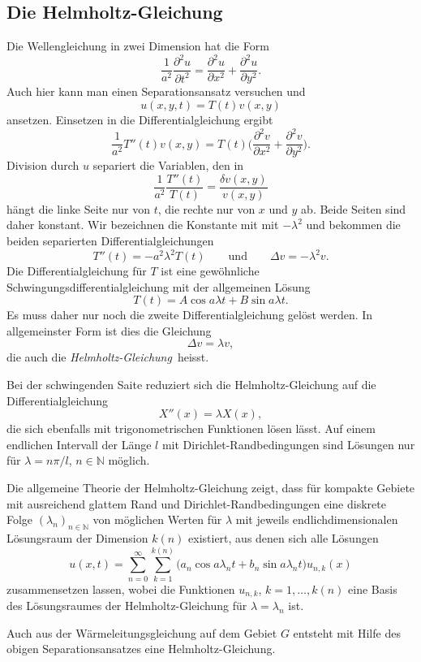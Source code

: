 \subsection{Die Helmholtz-Gleichung}
Die Wellengleichung in zwei Dimension hat die Form
\[
\frac{1}{a^2}
\frac{\partial^2u}{\partial t^2}
=
\frac{\partial^2 u}{\partial x^2}
+
\frac{\partial^2 u}{\partial y^2}.
\]
Auch hier kann man einen Separationsansatz versuchen und
\[
u(x,y,t) = T(t) v(x,y)
\]
ansetzen.
Einsetzen in die Differentialgleichung ergibt
\[
\frac{1}{a^2}
T''(t) v(x,y)
=
T(t)
\biggl(
\frac{\partial^2 v}{\partial x^2}
+
\frac{\partial^2 v}{\partial y^2}
\biggr).
\]
Division durch $u$ separiert die Variablen, den in
\[
\frac{1}{a^2}
\frac{T''(t)}{T(t)}
=
\frac{\delta v(x,y)}{v(x,y)}
\]
hängt die linke Seite nur von $t$, die rechte nur von $x$ und $y$ ab.
Beide Seiten sind daher konstant.
Wir bezeichnen die Konstante mit mit $-\lambda^2$ und bekommen die
beiden separierten Differentialgleichungen
\[
T''(t) = -a^2\lambda^2 T(t)
\qquad\text{und}\qquad
\Delta v = -\lambda^2 v.
\]
Die Differentialgleichung für $T$ ist eine gewöhnliche
Schwingungsdifferentialgleichung mit der allgemeinen Lösung
\[
T(t) = A\cos a\lambda t + B \sin a\lambda t.
\]
Es muss daher nur noch die zweite Differentialgleichung gelöst
werden.
In allgemeinster Form ist dies die Gleichung
\begin{equation}
\Delta v = \lambda v,
\end{equation}
die auch die {\em Helmholtz-Gleichung} heisst.
%


Bei der schwingenden Saite reduziert sich die Helmholtz-Gleichung
auf die Differentialgleichung
\[
X''(x) = \lambda X(x),
\]
die sich ebenfalls mit trigonometrischen Funktionen lösen lässt.
Auf einem endlichen Intervall der Länge $l$ mit Dirichlet-Randbedingungen
sind Lösungen nur für $\lambda=n\pi/l$, $n\in\mathbb{N}$ möglich.

Die allgemeine Theorie der Helmholtz-Gleichung zeigt, dass für
kompakte Gebiete mit ausreichend glattem Rand und Dirichlet-Randbedingungen
eine diskrete Folge $(\lambda_n)_{n\in\mathbb{N}}$ von möglichen Werten
für $\lambda$ mit jeweils endlichdimensionalen Lösungsraum der Dimension
$k(n)$ existiert, aus denen sich alle Lösungen
\[
u(x,t)
=
\sum_{n=0}^\infty
\sum_{k=1}^{k(n)}
\bigl(
a_n
\cos a\lambda_n t
+
b_n
\sin a\lambda_n t
\bigr)
u_{n,k}(x)
\]
zusammensetzen lassen, wobei die Funktionen $u_{n,k}$, $k=1,\dots,k(n)$
eine Basis des Lösungsraumes der Helmholtz-Gleichung für $\lambda=\lambda_n$
ist.

Auch aus der Wärmeleitungsgleichung auf dem Gebiet $G$ entsteht
mit Hilfe des obigen Separationsansatzes eine Helmholtz-Gleichung.

